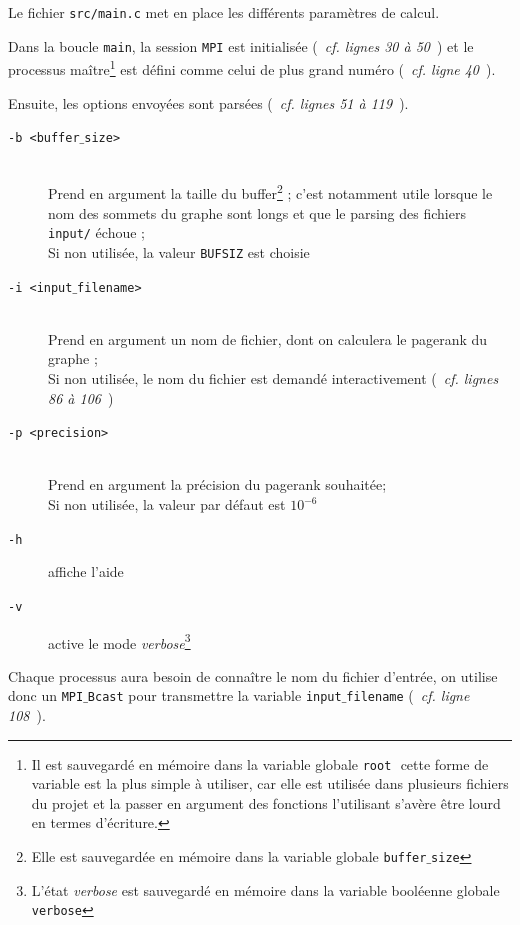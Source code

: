 \documentclass[a4paper,12pt]{article}
\begin{document}
Le fichier \texttt{src/main.c} met en place les différents paramètres de calcul.

\bigskip

Dans la boucle \texttt{main}, la session \texttt{MPI} est initialisée (~\textit{cf. lignes 30 à 50}~) et le processus maître\footnote{Il est sauvegardé en mémoire dans la variable globale \texttt{root} \textemdash $ $ cette forme de variable est la plus simple à utiliser, car elle est utilisée dans plusieurs fichiers du projet et la passer en argument des fonctions l'utilisant s'avère être lourd en termes d'écriture.} est défini comme celui de plus grand numéro (~\textit{cf. ligne 40}~).

\bigskip

Ensuite, les options envoyées sont parsées (~\textit{cf. lignes 51 à 119}~).

\begin{description}
  \item[\texttt{-b <buffer$\_$size>}]$ $\\Prend en argument la taille du buffer\footnote{Elle est sauvegardée en mémoire dans la variable globale \texttt{buffer$\_$size}} ; c'est notamment utile lorsque le nom des sommets du graphe sont longs et que le parsing des fichiers \texttt{input/} échoue ;\\Si non utilisée, la valeur \texttt{BUFSIZ} est choisie
  \item[\texttt{-i <input$\_$filename>}]$ $\\Prend en argument un nom de fichier, dont on calculera le pagerank du graphe ;\\Si non utilisée, le nom du fichier est demandé interactivement (~\textit{cf. lignes 86 à 106}~)
  \item[\texttt{-p <precision>}]$ $\\Prend en argument la précision du pagerank souhaitée;\\Si non utilisée, la valeur par défaut est $10^{-6}$
  \item[\texttt{-h}]affiche l'aide
  \item[\texttt{-v}]active le mode \textit{verbose}\footnote{L'état \textit{verbose} est sauvegardé en mémoire dans la variable booléenne globale \texttt{verbose}}
\end{description}

Chaque processus aura besoin de connaître le nom du fichier d'entrée, on utilise donc un \texttt{MPI$\_$Bcast} pour transmettre la variable \texttt{input$\_$filename} (~\textit{cf. ligne 108}~).
\end{document}

